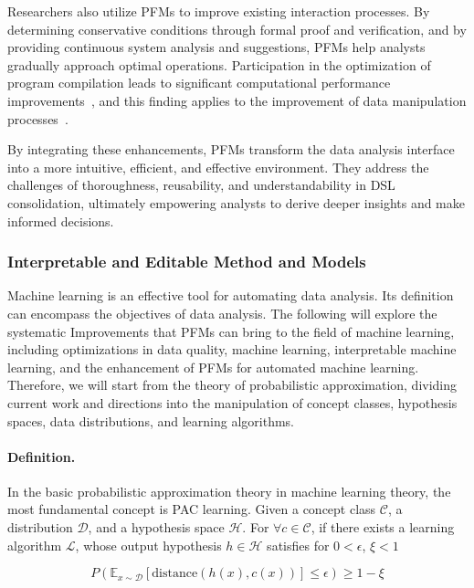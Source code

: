   Researchers also utilize PFMs to improve existing interaction processes. By determining conservative conditions through formal proof and verification, and by providing continuous system analysis and suggestions, PFMs help analysts gradually approach optimal operations. Participation in the optimization of program compilation leads to significant computational performance improvements~\cite{cummins2023large, cummins2024meta}, and this finding applies to the improvement of data manipulation processes~\cite{li2024can}.
  
  By integrating these enhancements, PFMs transform the data analysis interface into a more intuitive, efficient, and effective environment. They address the challenges of thoroughness, reusability, and understandability in DSL consolidation, ultimately empowering analysts to derive deeper insights and make informed decisions.
  
  \subsubsection{Interpretable and Editable Method and Models}\label{sec:editability}
  
  Machine learning is an effective tool for automating data analysis. Its definition can encompass the objectives of data analysis. The following will explore the systematic Improvements that PFMs can bring to the field of machine learning, including optimizations in data quality, machine learning, interpretable machine learning, and the enhancement of PFMs for automated machine learning. Therefore, we will start from the theory of probabilistic approximation, dividing current work and directions into the manipulation of concept classes, hypothesis spaces, data distributions, and learning algorithms.
  
  \paragraph{Definition.} In the basic probabilistic approximation theory in machine learning theory, the most fundamental concept is PAC learning. Given a concept class $\mathcal{C}$, a distribution $\mathcal{D}$, and a hypothesis space $\mathcal{H}$. For $\forall c \in \mathcal{C}$, if there exists a learning algorithm $\mathcal{L}$, whose output hypothesis $h \in \mathcal{H}$ satisfies for $0<\epsilon$, $\xi < 1$ 
  
  \begin{equation} P(\mathbb{E}_{x\sim \mathcal{D}}[\text{distance}(h(x), c(x))] \leq \epsilon) \geq 1-\xi \end{equation}
  
